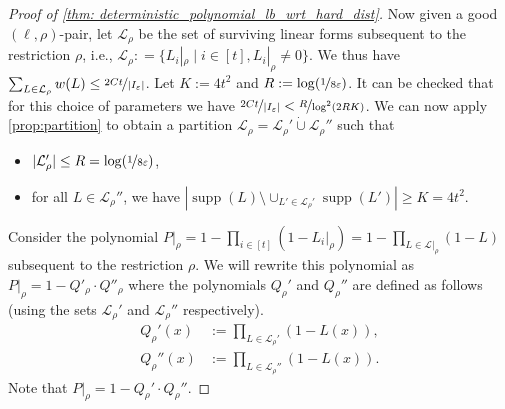 \documentclass[10pt,a4paper]{article}
\theoremstyle{plain}
\newtheorem{claim}[theorem]{Claim}
\theoremstyle{definition}
\renewcommand{\epsilon}{\varepsilon}
\newcommand{\eps}{\epsilon}
\newcommand{\disjunion}{\mathbin{\dot{\cup}}}
\newcommand{\union}{\mathbin{\cup}}
\newcommand{\supp}{\operatorname{supp}}
\newcommand{\calL}{{\mathcal{L}}}
\renewcommand{\calL}{\mathcal{L}}
\begin{document}
\begin{proof}[Proof of {\cref{thm:
      deterministic_polynomial_lb_wrt_hard_dist}}]
Now given a good $(\ell, \rho)$-pair, let $\calL_{\rho}$ be the set of surviving linear forms
    subsequent to the restriction $\rho$, i.e., $\calL_\rho : = \{ L_i|_\rho
    \mid i \in[t], L_i|_\rho \neq 0\}$. We thus have $\sum_{L \in \calL_\rho}
    w(L) \leq \nicefrac{2Ct}{|I_\eps|}$. Let $K :=4t^2$ and $R: =
    \log(\nicefrac1{8\eps})$. It can be checked that for this choice of parameters we have
    $\nicefrac{2Ct}{|I_\eps|} < \nicefrac{R}{\log^2 (2RK)}$.
We can now apply \cref{prop:partition} to obtain a partition
$\calL_\rho = \calL_\rho' \disjunion \calL_\rho''$ such that
\begin{itemize}
\item $|\calL_\rho'| \leq R = \log(\nicefrac1{8\eps})$,
\item for all $L \in \calL_\rho''$, we have $|\supp(L) \setminus
  \union_{L' \in \calL_\rho'} \supp(L') | \geq K=4t^2$.
\end{itemize}
Consider the polynomial $P|_\rho = 1 - \prod_{i \in [t]} (1-
L_i|_\rho) = 1- \prod_{L \in \calL|_\rho}(1-L)$ subsequent to the restriction $\rho$. We will rewrite this
polynomial as $P|_\rho = 1 - Q'_\rho \cdot Q''_\rho$ where the
polynomials $Q_\rho'$ and $Q_\rho''$ are defined as follows (using the
sets $\calL_\rho'$ and $\calL_\rho''$ respectively). 
\begin{align*}
Q_\rho'(x) &:= \prod_{L \in \calL_\rho'} (1-L(x)),\\
Q_\rho''(x) &:= \prod_{L \in \calL_\rho''} (1-L(x)).
\end{align*}
Note that $P|_\rho = 1- Q_\rho'\cdot Q_\rho''$. 


\end{proof}
\end{document}
